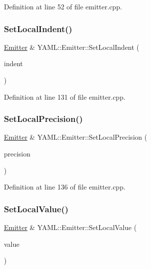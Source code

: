 Definition at line 52 of file emitter.\+cpp.

\mbox{\label{class_y_a_m_l_1_1_emitter_a483fff51e136ff84274c645d7f212f4b}} 
\subsubsection{\texorpdfstring{SetLocalIndent()}{SetLocalIndent()}}
{\footnotesize\ttfamily \mbox{\hyperlink{class_y_a_m_l_1_1_emitter}{Emitter}} \& Y\+A\+M\+L\+::\+Emitter\+::\+Set\+Local\+Indent (\begin{DoxyParamCaption}\item[{const \mbox{\hyperlink{struct_y_a_m_l_1_1___indent}{\+\_\+\+Indent}} \&}]{indent }\end{DoxyParamCaption})}



Definition at line 131 of file emitter.\+cpp.

\mbox{\label{class_y_a_m_l_1_1_emitter_a308004f77e3a2662379143a4eeabe9c3}} 
\subsubsection{\texorpdfstring{SetLocalPrecision()}{SetLocalPrecision()}}
{\footnotesize\ttfamily \mbox{\hyperlink{class_y_a_m_l_1_1_emitter}{Emitter}} \& Y\+A\+M\+L\+::\+Emitter\+::\+Set\+Local\+Precision (\begin{DoxyParamCaption}\item[{const \mbox{\hyperlink{struct_y_a_m_l_1_1___precision}{\+\_\+\+Precision}} \&}]{precision }\end{DoxyParamCaption})}



Definition at line 136 of file emitter.\+cpp.

\mbox{\label{class_y_a_m_l_1_1_emitter_adf24e3def57bce054b5a18aaef0ebd4d}} 
\subsubsection{\texorpdfstring{SetLocalValue()}{SetLocalValue()}}
{\footnotesize\ttfamily \mbox{\hyperlink{class_y_a_m_l_1_1_emitter}{Emitter}} \& Y\+A\+M\+L\+::\+Emitter\+::\+Set\+Local\+Value (\begin{DoxyParamCaption}\item[{\mbox{\hyperlink{namespace_y_a_m_l_a67c320aa50d3de7ecba1d0b8775dd684}{E\+M\+I\+T\+T\+E\+R\+\_\+\+M\+A\+N\+IP}}}]{value }\end{DoxyParamCaption})}



